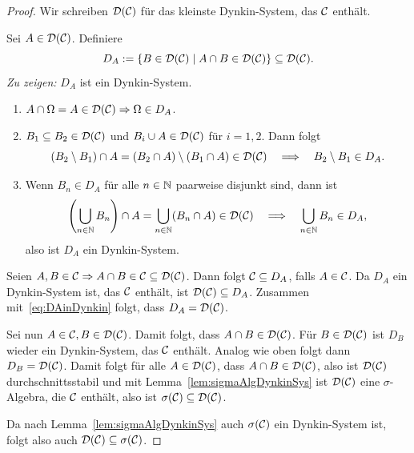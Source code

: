 \documentclass[language=ngerman]{../../Template/TemplateLecture}
\begin{document}
\begin{proof}
    Wir schreiben $\mathcal{D}(\mathcal{C})$ für das kleinste Dynkin-System, das $\mathcal{C}$ enthält.

    Sei $A \in \mathcal{D}(\mathcal{C})$. Definiere 
    \begin{equation}
        D_A := \{B \in \mathcal{D}(\mathcal{C}) \mid A \cap B \in \mathcal{D}(\mathcal{C})\} \subseteq \mathcal{D}(\mathcal{C}).\label{eq:DAinDynkin}
    \end{equation}
    \emph{Zu zeigen:} $D_A$ ist ein Dynkin-System.
    \begin{enumerate}[(\greek*)]
        \item $A \cap \Omega = A \in \mathcal{D}(\mathcal{C}) \Rightarrow \Omega \in D_A$.
        \item $B_1 \subseteq B_2 \in \mathcal{D}(\mathcal{C})$ und $B_i \cup A \in \mathcal{D}(\mathcal{C})$ für $i = 1, 2$. Dann folgt 
        \begin{equation}
            (B_2 \setminus B_1) \cap A = (B_2 \cap A) \setminus (B_1 \cap A) \in \mathcal{D}(\mathcal{C}) \quad \Longrightarrow \quad B_2 \setminus B_1 \in D_A.
        \end{equation}
        \item Wenn $B_n \in D_A$ für alle $n \in \mathbb{N}$ paarweise disjunkt sind, dann ist 
        \begin{equation}
            \left(\bigcup_{n \in \mathbb{N}} B_n \right) \cap A = \bigcup_{n \in \mathbb{N}} (B_n \cap A) \in \mathcal{D}(\mathcal{C}) \quad \Longrightarrow \quad \bigcup_{n \in \mathbb{N}} B_n \in D_A,
        \end{equation} 
        also ist $D_A$ ein Dynkin-System.
    \end{enumerate}

    Seien $A, B \in \mathcal{C} \Rightarrow A \cap B \in \mathcal{C} \subseteq \mathcal{D}(\mathcal{C})$. Dann folgt $\mathcal{C} \subseteq D_A$, falls $A \in \mathcal{C}$. Da $D_A$ ein Dynkin-System ist, das $\mathcal{C}$ enthält, ist $\mathcal{D}(\mathcal{C}) \subseteq D_A$. Zusammen mit~\eqref{eq:DAinDynkin} folgt, dass $D_A = \mathcal{D}(\mathcal{C})$.

    Sei nun $A \in \mathcal{C}, B \in \mathcal{D}(\mathcal{C})$. Damit folgt, dass $A \cap B \in \mathcal{D}(\mathcal{C})$. Für $B \in \mathcal{D}(\mathcal{C})$ ist $D_B$ wieder ein Dynkin-System, das $\mathcal{C}$ enthält. Analog wie oben folgt dann $D_B = \mathcal{D}(\mathcal{C})$. Damit folgt für alle $A \in \mathcal{D}(\mathcal{C})$, dass $A \cap B \in \mathcal{D}(\mathcal{C})$, also ist $\mathcal{D}(\mathcal{C})$ durchschnittsstabil und mit Lemma~\ref{lem:sigmaAlgDynkinSys} ist $\mathcal{D}(\mathcal{C})$ eine $\sigma$-Algebra, die $\mathcal{C}$ enthält, also ist $\sigma(\mathcal{C}) \subseteq \mathcal{D}(\mathcal{C})$.

    Da nach Lemma~\ref{lem:sigmaAlgDynkinSys} auch $\sigma(\mathcal{C})$ ein Dynkin-System ist, folgt also auch $\mathcal{D}(\mathcal{C}) \subseteq \sigma(\mathcal{C})$. 
\end{proof}
\end{document}
